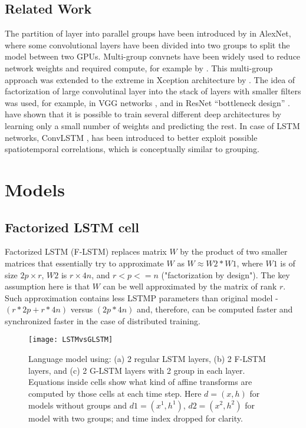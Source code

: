 \documentclass{article} \usepackage{iclr2017_workshop,times}
\begin{document}
\subsection{Related Work}
The partition of layer into parallel groups have been introduced by \citet{krizhevsky2012imagenet} in AlexNet, where some convolutional layers have been divided into two groups to split the model between two GPUs.  Multi-group convnets have been widely used to reduce network weights and required compute, for example by \citet{esser2016convolutional}. This multi-group approach was extended to the extreme in  Xception architecture by \citet{chollet2016xception}.
The idea of factorization of large convolutinal layer into the stack of layers with smaller filters was used, for example, in VGG networks \citep{simonyan2014very}, and in ResNet ``bottleneck design'' \citep{He_2016_CVPR}. \citet{denil2013predicting} have shown that it is possible to train several different deep architectures by learning only a small number of weights and predicting the rest.
In case of LSTM networks, ConvLSTM \citep{Shi:2015:CLN:2969239.2969329}, has been introduced to better exploit possible spatiotemporal correlations, which is conceptually similar to grouping.

\section{Models}

\subsection{Factorized LSTM cell}
Factorized LSTM (F-LSTM) replaces matrix $W$  by the product of two smaller matrices that essentially try to approximate $W$ as $W\approx W2*W1$, where $W1$ is of size $ 2p \times r$, $W2$ is  $r \times 4n$, and  $r<p<=n$ ("factorization by design"). The key assumption here is that $W$ can be well approximated by the matrix of rank $r$. Such approximation contains less LSTMP parameters than original model - $(r*2p+r*4n)$ versus $(2p*4n)$ and, therefore, can be computed faster and synchronized faster in the case of distributed training.
\begin{figure}[h]
\begin{center}
\texttt{[image: LSTMvsGLSTM]}
\end{center}
\caption{ Language model using: (a) 2 regular LSTM layers, (b) 2 F-LSTM layers, and (c) 2 G-LSTM layers with 2 group in each layer. Equations inside cells show what kind of affine transforms are computed by those cells at each time step. Here $d=(x,h)$ for models without groups and $d1=(x^1,h^1)$, $d2=(x^2,h^2)$ for model with two groups; and time index dropped for clarity.}
\label{fig:glstm}
\end{figure}
\end{document}
